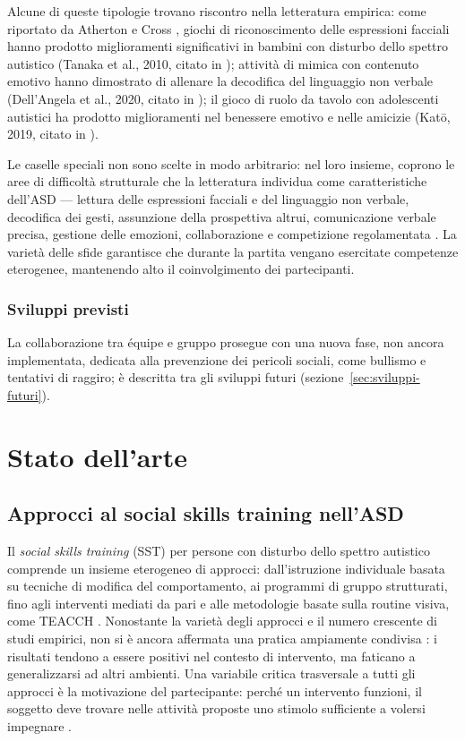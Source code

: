 \documentclass[12pt]{report}
\begin{document}
Alcune di queste tipologie trovano riscontro nella letteratura empirica: come riportato da Atherton e Cross \cite{atherton2021}, giochi di riconoscimento delle espressioni facciali hanno prodotto miglioramenti significativi in bambini con disturbo dello spettro autistico (Tanaka et al., 2010, citato in \cite{atherton2021}); attività di mimica con contenuto emotivo hanno dimostrato di allenare la decodifica del linguaggio non verbale (Dell'Angela et al., 2020, citato in \cite{atherton2021}); il gioco di ruolo da tavolo con adolescenti autistici ha prodotto miglioramenti nel benessere emotivo e nelle amicizie (Katō, 2019, citato in \cite{atherton2021}).

Le caselle speciali non sono scelte in modo arbitrario: nel loro insieme, coprono le aree di difficoltà strutturale che la letteratura individua come caratteristiche dell'ASD --- lettura delle espressioni facciali e del linguaggio non verbale, decodifica dei gesti, assunzione della prospettiva altrui, comunicazione verbale precisa, gestione delle emozioni, collaborazione e competizione regolamentata \cite{mesibov2005}. La varietà delle sfide garantisce che durante la partita vengano esercitate competenze eterogenee, mantenendo alto il coinvolgimento dei partecipanti.

\subsection{Sviluppi previsti}

La collaborazione tra équipe e gruppo prosegue con una nuova fase, non ancora implementata, dedicata alla prevenzione dei pericoli sociali, come bullismo e tentativi di raggiro; è descritta tra gli sviluppi futuri (sezione~\ref{sec:sviluppi-futuri}).

% 
% 

\chapter{Stato dell'arte}
\label{cap:stato-arte}

\section{Approcci al social skills training nell'ASD}

Il \textit{social skills training} (SST) per persone con disturbo dello spettro autistico comprende un insieme eterogeneo di approcci: dall'istruzione individuale basata su tecniche di modifica del comportamento, ai programmi di gruppo strutturati, fino agli interventi mediati da pari e alle metodologie basate sulla routine visiva, come TEACCH \cite{mesibov2005}. Nonostante la varietà degli approcci e il numero crescente di studi empirici, non si è ancora affermata una pratica ampiamente condivisa \cite{carneiro2024}: i risultati tendono a essere positivi nel contesto di intervento, ma faticano a generalizzarsi ad altri ambienti. Una variabile critica trasversale a tutti gli approcci è la motivazione del partecipante: perché un intervento funzioni, il soggetto deve trovare nelle attività proposte uno stimolo sufficiente a volersi impegnare \cite{mesibov2005}.
\end{document}
